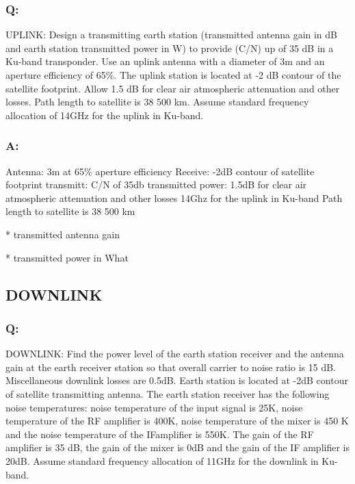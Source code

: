\documentclass[11pt]{article}
\begin{document}
\subsubsection{Q:}
UPLINK: Design a transmitting earth station (transmitted antenna gain in dB and earth station transmitted power in W) to provide (C/N) up of 35 dB in a Ku-band transponder. Use an uplink antenna with a diameter of 3m and an aperture efficiency of 65\%. The uplink station is located at -2 dB contour of the satellite footprint. Allow 1.5 dB for clear air atmospheric attenuation and other losses. Path length to satellite is 38 500 km. Assume standard frequency allocation of 14GHz for the uplink in Ku-band.


\subsubsection{A:}

Antenna: 3m at 65\% aperture efficiency
Receive: -2dB contour of satellite footprint
transmitt: C/N of 35db
transmitted power: 1.5dB for clear air atmospheric attenuation and other losses
14Ghz for the uplink in Ku-band
Path length to satellite is 38 500 km


* transmitted antenna gain

* transmitted power in What



\subsection{DOWNLINK}\label{DOWNLINK}

\subsubsection{Q:}

DOWNLINK: Find the power level of the earth station receiver and the antenna gain at the earth receiver station so that overall carrier to noise ratio is 15 dB. Miscellaneous downlink losses are 0.5dB. Earth station is located at -2dB contour of satellite transmitting antenna. The earth station receiver has the following noise temperatures: noise temperature of the input signal is 25K, noise temperature of the RF amplifier is 400K, noise temperature of the mixer is 450 K and the noise temperature of the IFamplifier is 550K. The gain of the RF amplifier is 35 dB, the gain of the mixer is 0dB and the gain of the IF amplifier is 20dB. Assume standard frequency allocation of 11GHz for the downlink in Ku-band.
\end{document}
